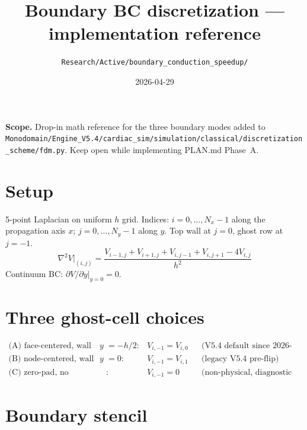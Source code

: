 \documentclass[11pt,letterpaper]{article}
\title{Boundary BC discretization --- implementation reference}
\author{\texttt{Research/Active/boundary\_conduction\_speedup/}}
\date{2026-04-29}
\begin{document}
\maketitle

\noindent\textbf{Scope.} Drop-in math reference for the three boundary modes
added to \texttt{Monodomain/Engine\_V5.4/cardiac\_sim/simulation/classical/discretization\_scheme/fdm.py}.
Keep open while implementing PLAN.md Phase~A.

\section{Setup}

5-point Laplacian on uniform $h$ grid. Indices: $i = 0, \dots, N_x-1$ along the
propagation axis $x$; $j = 0, \dots, N_y-1$ along $y$. Top wall at $j = 0$,
ghost row at $j = -1$.
\begin{equation}
\nabla^2 V \big|_{(i,j)} = \frac{V_{i-1,j} + V_{i+1,j} + V_{i,j-1} + V_{i,j+1} - 4 V_{i,j}}{h^2}
\end{equation}
Continuum BC: $\partial V / \partial y \big|_{y=0} = 0$.

\section{Three ghost-cell choices}

\begin{align}
\text{(A) face-centered, wall at } y &= -h/2 :   & \boxed{V_{i,-1} = V_{i,0}}     && \text{(V5.4 default since 2026-04-29)} \\
\text{(B) node-centered, wall at } y &= 0      :  & \boxed{V_{i,-1} = V_{i,1}}     && \text{(legacy V5.4 pre-flip)} \\
\text{(C) zero-pad,      no Neumann}             & : & \boxed{V_{i,-1} = 0}           && \text{(non-physical, diagnostic only)}
\end{align}

\section{Boundary stencil}
\end{document}
